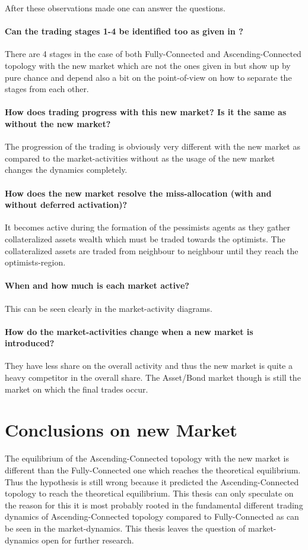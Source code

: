 \documentclass[Bachelorarbeit.tex]{subfiles}
\begin{document}
After these observations made one can answer the questions.

\paragraph{Can the trading stages 1-4 be identified too as given in \cite{Breuer2015}?}
There are 4 stages in the case of both Fully-Connected and Ascending-Connected topology with the new market which are not the ones given in \cite{Breuer2015} but show up by pure chance and depend also a bit on the point-of-view on how to separate the stages from each other. 

\paragraph{How does trading progress with this new market? Is it the same as without the new market?}
The progression of the trading is obviously very different with the new market as compared to the market-activities without as the usage of the new market changes the dynamics completely.

\paragraph{How does the new market resolve the miss-allocation (with and without deferred activation)?}
It becomes active during the formation of the pessimists agents as they gather collateralized assets wealth which must be traded towards the optimists. The collateralized assets are traded from neighbour to neighbour until they reach the optimists-region.

\paragraph{When and how much is each market active?}
This can be seen clearly in the market-activity diagrams.

\paragraph{How do the market-activities change when a new market is introduced?}
They have less share on the overall activity and thus the new market is quite a heavy competitor in the overall share. The Asset/Bond market though is still the market on which the final trades occur.

\section{Conclusions on new Market}
The equilibrium of the Ascending-Connected topology with the new market is different than the Fully-Connected one which reaches the theoretical equilibrium. Thus the hypothesis is still wrong because it predicted the Ascending-Connected topology to reach the theoretical equilibrium. This thesis can only speculate on the reason for this it is most probably rooted in the fundamental different trading dynamics of Ascending-Connected topology compared to Fully-Connected as can be seen in the market-dynamics. This thesis leaves the question of market-dynamics open for further research.
\end{document}
